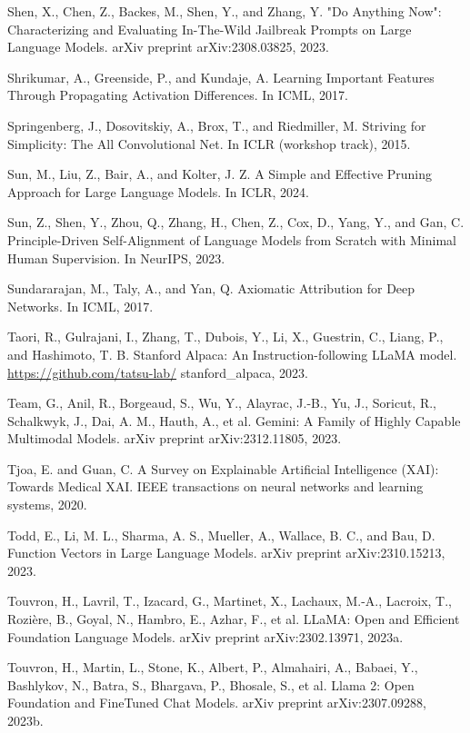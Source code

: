\documentclass[10pt]{article}
\begin{document}
Shen, X., Chen, Z., Backes, M., Shen, Y., and Zhang, Y. "Do Anything Now": Characterizing and Evaluating In-The-Wild Jailbreak Prompts on Large Language Models. arXiv preprint arXiv:2308.03825, 2023.

Shrikumar, A., Greenside, P., and Kundaje, A. Learning Important Features Through Propagating Activation Differences. In ICML, 2017.

Springenberg, J., Dosovitskiy, A., Brox, T., and Riedmiller, M. Striving for Simplicity: The All Convolutional Net. In ICLR (workshop track), 2015.

Sun, M., Liu, Z., Bair, A., and Kolter, J. Z. A Simple and Effective Pruning Approach for Large Language Models. In ICLR, 2024.

Sun, Z., Shen, Y., Zhou, Q., Zhang, H., Chen, Z., Cox, D., Yang, Y., and Gan, C. Principle-Driven Self-Alignment of Language Models from Scratch with Minimal Human Supervision. In NeurIPS, 2023.

Sundararajan, M., Taly, A., and Yan, Q. Axiomatic Attribution for Deep Networks. In ICML, 2017.

Taori, R., Gulrajani, I., Zhang, T., Dubois, Y., Li, X., Guestrin, C., Liang, P., and Hashimoto, T. B. Stanford Alpaca: An Instruction-following LLaMA model. \href{https://github.com/tatsu-lab/}{https://github.com/tatsu-lab/} stanford\_alpaca, 2023.

Team, G., Anil, R., Borgeaud, S., Wu, Y., Alayrac, J.-B., Yu, J., Soricut, R., Schalkwyk, J., Dai, A. M., Hauth, A., et al. Gemini: A Family of Highly Capable Multimodal Models. arXiv preprint arXiv:2312.11805, 2023.

Tjoa, E. and Guan, C. A Survey on Explainable Artificial Intelligence (XAI): Towards Medical XAI. IEEE transactions on neural networks and learning systems, 2020.

Todd, E., Li, M. L., Sharma, A. S., Mueller, A., Wallace, B. C., and Bau, D. Function Vectors in Large Language Models. arXiv preprint arXiv:2310.15213, 2023.

Touvron, H., Lavril, T., Izacard, G., Martinet, X., Lachaux, M.-A., Lacroix, T., Rozière, B., Goyal, N., Hambro, E., Azhar, F., et al. LLaMA: Open and Efficient Foundation Language Models. arXiv preprint arXiv:2302.13971, 2023a.

Touvron, H., Martin, L., Stone, K., Albert, P., Almahairi, A., Babaei, Y., Bashlykov, N., Batra, S., Bhargava, P., Bhosale, S., et al. Llama 2: Open Foundation and FineTuned Chat Models. arXiv preprint arXiv:2307.09288, 2023b.
\end{document}
